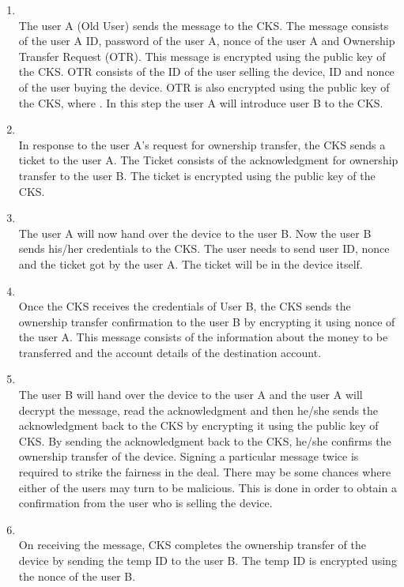 \documentclass[letterpaper]{article}
\begin{document}
			\begin{enumerate}
				\item  \\ 
				The user A (Old User) sends the message to the CKS. The message consists of the user A ID, password of the user A, nonce of the user A and Ownership Transfer Request (OTR). This message is encrypted using the public key of the CKS. OTR consists of the ID of the user selling the device, ID and nonce of the user buying the device. OTR is also encrypted using the public key of the CKS, where . In this step the user A will introduce user B to the CKS.  
				\item  \\ 
				In response to the user A's request for ownership transfer, the CKS sends a ticket to the user A. The Ticket consists of the acknowledgment for ownership transfer to the user B. The ticket is encrypted using the public key of the CKS.
				\item \\ 
				The user A will now hand over the device to the user B. Now the user B sends his/her credentials to the CKS. The user needs to send user ID, nonce and the ticket got by the user A. The ticket will be in the device itself.   
			 \item \\ 
					Once the CKS receives the credentials of User B, the CKS sends the ownership transfer confirmation to the user B by encrypting it using nonce of the user A. This message consists of the information about the money to be transferred and the account details of the destination account. 
				\item \\ 
				The user B will hand over the device to the user A and the user A will decrypt the message, read the acknowledgment and then he/she sends the acknowledgment back to the CKS by encrypting it using the public key of CKS. By sending the acknowledgment back to the CKS, he/she confirms the ownership transfer of the device. Signing a particular message twice is required to strike the fairness in the deal. There may be some chances where either of the users may turn to be malicious. This is done in order to obtain a confirmation from the user who is selling the device. 
				\item \\ 
				On receiving the message, CKS completes the ownership transfer of the device by sending the temp ID  to the user B. The temp ID is encrypted using the nonce of the user B. 
								
			\end{enumerate}
	
\end{document}
